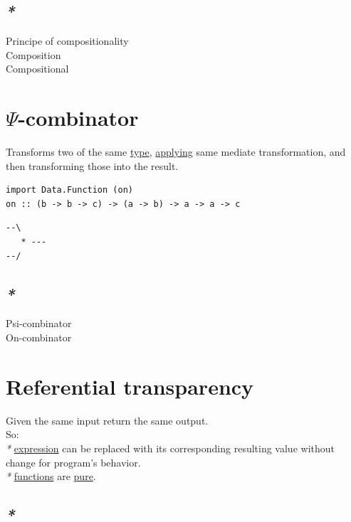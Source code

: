 \documentclass[a4paper,14pt,oneside]{book}
\begin{document}
\section{\emph{*}}
\label{sec:org2ef4436}

\label{orgc3f1289}Principe of compositionality\\
\label{org2a78975}Composition\\
\label{orgfd1194c}Compositional\\

\chapter{\label{org2e11375}\(\Psi\)-combinator}
\label{sec:org6c5478c}
Transforms two of the same \hyperref[orgb064f4e]{type}, \hyperref[org8ea5731]{applying} same mediate transformation, and then transforming those into the result.\\
\begin{verbatim}
import Data.Function (on)
on :: (b -> b -> c) -> (a -> b) -> a -> a -> c
\end{verbatim}

\begin{verbatim}
--\
   * ---
--/
\end{verbatim}

\section{\emph{*}}
\label{sec:orgfb41144}

\label{org9b46bc4}Psi-combinator\\
\label{org9cc47c6}On-combinator\\

\chapter{\label{orgbbc061a}Referential transparency}
\label{sec:org6ffdb73}
Given the same input return the same output.\\
So:\\
\emph{*} \hyperref[orgc25ca10]{expression} can be replaced with its corresponding resulting value without change for program's behavior.\\
\emph{*} \hyperref[org50b1dc4]{functions} are \hyperref[org5032341]{pure}.\\

\section{\emph{*}}
\label{sec:org16fa6f6}
\end{document}
